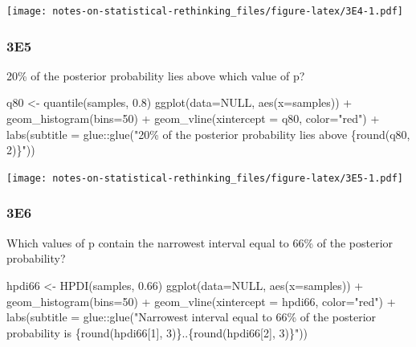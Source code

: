 \documentclass[
]{book}
\newenvironment{Shaded}{\begin{snugshade}}{\end{snugshade}}
\newcommand{\AttributeTok}[1]{\textcolor[rgb]{0.77,0.63,0.00}{#1}}
\newcommand{\ConstantTok}[1]{\textcolor[rgb]{0.00,0.00,0.00}{#1}}
\newcommand{\DecValTok}[1]{\textcolor[rgb]{0.00,0.00,0.81}{#1}}
\newcommand{\FloatTok}[1]{\textcolor[rgb]{0.00,0.00,0.81}{#1}}
\newcommand{\FunctionTok}[1]{\textcolor[rgb]{0.00,0.00,0.00}{#1}}
\newcommand{\NormalTok}[1]{#1}
\newcommand{\OtherTok}[1]{\textcolor[rgb]{0.56,0.35,0.01}{#1}}
\newcommand{\SpecialCharTok}[1]{\textcolor[rgb]{0.00,0.00,0.00}{#1}}
\newcommand{\StringTok}[1]{\textcolor[rgb]{0.31,0.60,0.02}{#1}}
\begin{document}
\texttt{[image: notes-on-statistical-rethinking\_files/figure-latex/3E4-1.pdf]}

\hypertarget{e5}{%
\subsubsection*{3E5}\label{e5}}

20\% of the posterior probability lies above which value of p?

\begin{Shaded}
\begin{Highlighting}[]
\NormalTok{q80 }\OtherTok{\textless{}{-}} \FunctionTok{quantile}\NormalTok{(samples, }\FloatTok{0.8}\NormalTok{)}
\FunctionTok{ggplot}\NormalTok{(}\AttributeTok{data=}\ConstantTok{NULL}\NormalTok{, }\FunctionTok{aes}\NormalTok{(}\AttributeTok{x=}\NormalTok{samples)) }\SpecialCharTok{+} 
  \FunctionTok{geom\_histogram}\NormalTok{(}\AttributeTok{bins=}\DecValTok{50}\NormalTok{) }\SpecialCharTok{+} 
  \FunctionTok{geom\_vline}\NormalTok{(}\AttributeTok{xintercept =}\NormalTok{ q80, }\AttributeTok{color=}\StringTok{"red"}\NormalTok{) }\SpecialCharTok{+} 
  \FunctionTok{labs}\NormalTok{(}\AttributeTok{subtitle =}\NormalTok{ glue}\SpecialCharTok{::}\FunctionTok{glue}\NormalTok{(}\StringTok{"20\% of the posterior probability lies above \{round(q80, 2)\}"}\NormalTok{))}
\end{Highlighting}
\end{Shaded}

\texttt{[image: notes-on-statistical-rethinking\_files/figure-latex/3E5-1.pdf]}

\hypertarget{e6}{%
\subsubsection*{3E6}\label{e6}}

Which values of p contain the narrowest interval equal to 66\% of the posterior probability?

\begin{Shaded}
\begin{Highlighting}[]
\NormalTok{hpdi66 }\OtherTok{\textless{}{-}} \FunctionTok{HPDI}\NormalTok{(samples, }\FloatTok{0.66}\NormalTok{)}
\FunctionTok{ggplot}\NormalTok{(}\AttributeTok{data=}\ConstantTok{NULL}\NormalTok{, }\FunctionTok{aes}\NormalTok{(}\AttributeTok{x=}\NormalTok{samples)) }\SpecialCharTok{+} 
  \FunctionTok{geom\_histogram}\NormalTok{(}\AttributeTok{bins=}\DecValTok{50}\NormalTok{) }\SpecialCharTok{+} 
  \FunctionTok{geom\_vline}\NormalTok{(}\AttributeTok{xintercept =}\NormalTok{ hpdi66, }\AttributeTok{color=}\StringTok{"red"}\NormalTok{) }\SpecialCharTok{+} 
  \FunctionTok{labs}\NormalTok{(}\AttributeTok{subtitle =}\NormalTok{ glue}\SpecialCharTok{::}\FunctionTok{glue}\NormalTok{(}\StringTok{"Narrowest interval equal to 66\% of the posterior probability is \{round(hpdi66[1], 3)\}..\{round(hpdi66[2], 3)\}"}\NormalTok{))}
\end{Highlighting}
\end{Shaded}
\end{document}
